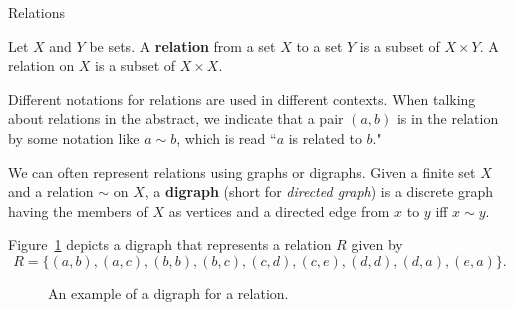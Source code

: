 \begin{section}{Relations}

\begin{definition}
Let \(X\) and \(Y\) be sets. A \textbf{relation} from a set \(X\) to a set \(Y\) is a subset of \(X \times Y\). A relation on \(X\) is a subset of \(X \times X\).  
\end{definition}

\begin{remark}
Different notations for relations are used in different contexts.  When talking about relations in the abstract, we indicate that a pair \((a,b)\) is in the relation by some notation like \(a\sim b\), which is read ``\(a\) is related to \(b\)."
\end{remark}

\begin{remark}
We can often represent relations using graphs or digraphs.  Given a finite set \(X\) and a relation \(\sim\) on \(X\), a \textbf{digraph} (short for \emph{directed graph}) is a discrete graph having the members of \(X\) as vertices and a directed edge from \(x\) to \(y\) iff \(x\sim y\).
\end{remark}

\begin{example}
Figure~\ref{fig:digraph} depicts a digraph that represents a relation \(R\) given by
\[
R=\{(a,b),(a,c),(b,b),(b,c),(c,d),(c,e),(d,d),(d,a),(e,a)\}.
\]

\begin{figure}[h]
\begin{center}
\caption{An example of a digraph for a relation.}\label{fig:digraph}
\end{center}
\end{figure}


\end{example}
\end{section}
